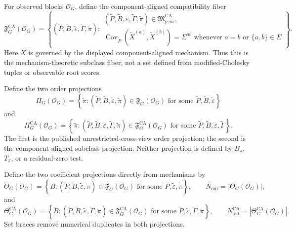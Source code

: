 For observed blocks \(\mathcal O_G\), define the component-aligned compatibility fiber
\[
 \mathfrak F_G^{\mathrm{CA}}(\mathcal O_G)
 =\left\{(\widetilde P,\widetilde B,\widetilde\varepsilon,
 \widetilde\Gamma,\widetilde\pi):
 \begin{array}{l}
 (\widetilde P,\widetilde B,\widetilde\varepsilon,
 \widetilde\Gamma,\widetilde\pi)
 \in\mathfrak M_{p,m}^{\mathrm{CA}},\\
 \operatorname{Cov}_{\widetilde P}(\widetilde X^{(a)},
 \widetilde X^{(b)})=\Sigma^{ab}
 \text{ whenever }a=b\text{ or }\{a,b\}\in E
 \end{array}\right\}.
\]
Here \(\widetilde X\) is governed by the displayed component-aligned mechanism.  Thus this is the mechanism-theoretic subclass fiber, not a set defined from modified-Cholesky tuples or observable root scores.

Define the two order projections
\[
 \Pi_G(\mathcal O_G)=
 \left\{\widetilde\pi:
 (\widetilde P,\widetilde B,\widetilde\varepsilon,
 \widetilde\pi)\in\mathfrak F_G(\mathcal O_G)
 \text{ for some }\widetilde P,\widetilde B,
 \widetilde\varepsilon\right\}
\]
and
\[
 \Pi_G^{\mathrm{CA}}(\mathcal O_G)=
 \left\{\widetilde\pi:
 (\widetilde P,\widetilde B,\widetilde\varepsilon,
 \widetilde\Gamma,\widetilde\pi)
 \in\mathfrak F_G^{\mathrm{CA}}(\mathcal O_G)
 \text{ for some }\widetilde P,\widetilde B,
 \widetilde\varepsilon,\widetilde\Gamma\right\}.
\]
The first is the published unrestricted-cross-view order projection; the second is the component-aligned subclass projection.  Neither projection is defined by \(B_\pi\), \(T_\pi\), or a residual-zero test.

Define the two coefficient projections directly from mechanisms by
\[
 \Theta_G(\mathcal O_G)=
 \left\{\widetilde B:
 (\widetilde P,\widetilde B,\widetilde\varepsilon,
 \widetilde\pi)\in\mathfrak F_G(\mathcal O_G)
 \text{ for some }\widetilde P,\widetilde\varepsilon,
 \widetilde\pi\right\},
 \qquad N_{\mathrm{out}}=|\Theta_G(\mathcal O_G)|,
\]
and
\[
 \Theta_G^{\mathrm{CA}}(\mathcal O_G)=
 \left\{\widetilde B:
 (\widetilde P,\widetilde B,\widetilde\varepsilon,
 \widetilde\Gamma,\widetilde\pi)
 \in\mathfrak F_G^{\mathrm{CA}}(\mathcal O_G)
 \text{ for some }\widetilde P,\widetilde\varepsilon,
 \widetilde\Gamma,\widetilde\pi\right\},
 \qquad
 N_{\mathrm{out}}^{\mathrm{CA}}
 =|\Theta_G^{\mathrm{CA}}(\mathcal O_G)|.
\]
Set braces remove numerical duplicates in both projections.

